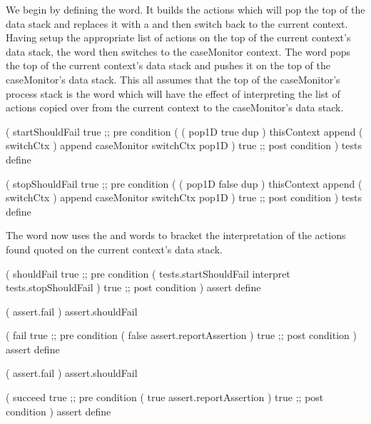 We begin by defining the  word. It builds the 
actions which will pop the top of the data stack and replaces it with a 
 and then switch back to the current context. Having setup the 
appropriate list of actions on the top of the current context's data 
stack, the  word then switches to the caseMonitor 
context. The  word pops the top of the current context's 
data stack and pushes it on the top of the caseMonitor's data stack. This 
all assumes that the top of the caseMonitor's process stack is the 
 word which will have the effect of interpreting the list 
of actions copied over from the current context to the caseMonitor's data 
stack. 

\startJoylolCode
(
  startShouldFail
  { true }        ;; pre condition
  (
    (
      pop1D
      true
      dup
    ) 
    thisContext
    append
    ( switchCtx )
    append
    caseMonitor
    switchCtx
    pop1D
  )
  { true } ;; post condition
)
tests
define 
\stopJoylolCode 

\startJoylolCode
(
  stopShouldFail
  { true } ;; pre condition
  (
    (
      pop1D
      false
      dup
    )
    thisContext
    append
    ( switchCtx )
    append
    caseMonitor
    switchCtx
    pop1D
  )
  { true } ;; post condition
)
tests
define
\stopJoylolCode

The  word now uses the 
 and  words to 
bracket the interpretation of the actions found quoted on the current 
context's data stack. 

\startJoylolCode
(
  shouldFail
  { true } ;; pre condition
  (
    tests.startShouldFail
    interpret
    tests.stopShouldFail
  )
  { true } ;; post condition
)
assert
define
\stopJoylolCode

\startJoylolTest
( assert.fail ) assert.shouldFail
\stopJoylolTest
\stopTestCase
\stopTestSuite


\startJoylolCode
(
  fail
  { true } ;; pre condition
  (
    false
    assert.reportAssertion
  )
  { true } ;; post condition
)
assert
define
\stopJoylolCode

\startJoylolTest
( assert.fail ) assert.shouldFail
\stopJoylolTest
\stopTestCase
\stopTestSuite

\startJoylolCode
( 
  succeed
  { true } ;; pre condition
  (
    true
    assert.reportAssertion
  )
  { true } ;; post condition
)
assert
define
\stopJoylolCode

